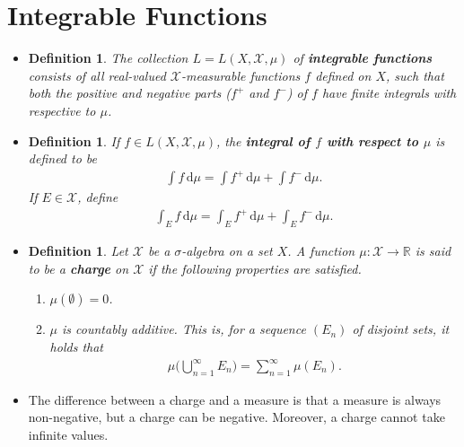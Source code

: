 \documentclass[10pt]{article}
\newtheorem{definition}[lemma]{Definition}
\newcommand{\dee}{\mathrm{d}}
\newcommand{\mcal}[1]{\mathcal{#1}}
\newcommand{\Real}{\mathbb{R}}
\begin{document}
\section{Integrable Functions}

\begin{itemize}
  \item \begin{definition}
    The collection $L = L(X,\mcal{X},\mu)$ of {\bf integrable functions} consists of all real-valued $\mcal{X}$-measurable functions $f$ defined on $X$, such that both the positive and negative parts ($f^+$ and $f^-$) of $f$ have finite integrals with respective to $\mu$.
  \end{definition}

  \item \begin{definition}
    If $f \in L(X,\mcal{X},\mu)$, the {\bf integral of $f$ with respect to $\mu$} is defined to be
    \begin{align*}
      \int f \, \dee\mu = \int f^+\, \dee\mu + \int f^-\, \dee\mu.
    \end{align*}
    If $E \in \mcal{X}$, define 
    \begin{align*}
      \int_E f \, \dee\mu = \int_E f^+\, \dee\mu + \int_E f^-\, \dee\mu.
    \end{align*}
  \end{definition}

  \item \begin{definition}
    Let $\mcal{X}$ be a $\sigma$-algebra on a set $X$. A function $\mu: \mcal{X} \rightarrow 
    \Real$ is said to be a {\bf charge} on $\mcal{X}$ if the following properties are satisfied.
    \begin{enumerate}
      \item $\mu(\emptyset) = 0$.
      \item $\mu$ is countably additive. This is, for a sequence $(E_n)$ of disjoint sets, it holds that
      \begin{align*}
        \mu\bigg( \bigcup_{n=1}^\infty E_n \bigg) = \sum_{n=1}^\infty \mu(E_n).
      \end{align*}
    \end{enumerate}
  \end{definition}

  \item The difference between a charge and a measure is that a measure is always non-negative, but a charge can be negative. Moreover, a charge cannot take infinite values.
  

\end{itemize}
\end{document}
